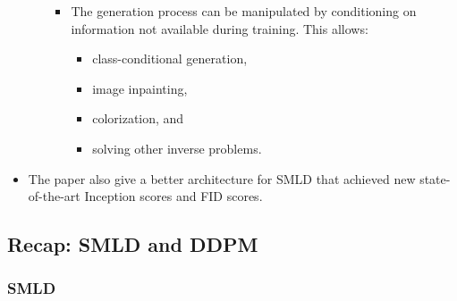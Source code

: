 \documentclass[10pt]{article}
\begin{document}
\begin{itemize}
\begin{itemize}
\begin{itemize}
      \item The generation process can be manipulated by conditioning on information not available during training. This allows:
      \begin{itemize}
        \item class-conditional generation,
        \item image inpainting,
        \item colorization, and
        \item solving other inverse problems.
      \end{itemize}
    \end{itemize}
  \end{itemize}

  \item The paper also give a better architecture for SMLD that achieved new state-of-the-art Inception scores and FID scores.
\end{itemize}

\subsection{Recap: SMLD and DDPM}

\subsubsection{SMLD}
\end{document}
